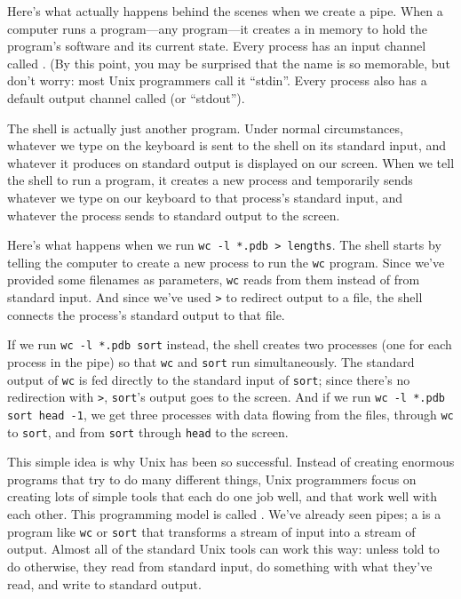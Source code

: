 \documentclass{book}
\begin{document}
Here's what actually happens behind the scenes when we create a pipe.
When a computer runs a program---any program---it creates a
 in memory to hold the program's software
and its current state. Every process has an input channel called
. (By this point, you may be
surprised that the name is so memorable, but don't worry: most Unix
programmers call it ``stdin''. Every process also has a default output
channel called  (or
``stdout'').

The shell is actually just another program. Under normal circumstances,
whatever we type on the keyboard is sent to the shell on its standard
input, and whatever it produces on standard output is displayed on our
screen. When we tell the shell to run a program, it creates a new
process and temporarily sends whatever we type on our keyboard to that
process's standard input, and whatever the process sends to standard
output to the screen.

Here's what happens when we run
\texttt{wc -l *.pdb \textgreater{} lengths}. The shell starts by telling
the computer to create a new process to run the \texttt{wc} program.
Since we've provided some filenames as parameters, \texttt{wc} reads
from them instead of from standard input. And since we've used
\texttt{\textgreater{}} to redirect output to a file, the shell connects
the process's standard output to that file.

If we run \texttt{wc -l *.pdb \textbar{} sort} instead, the shell
creates two processes (one for each process in the pipe) so that
\texttt{wc} and \texttt{sort} run simultaneously. The standard output of
\texttt{wc} is fed directly to the standard input of \texttt{sort};
since there's no redirection with \texttt{\textgreater{}},
\texttt{sort}'s output goes to the screen. And if we run
\texttt{wc -l *.pdb \textbar{} sort \textbar{} head -1}, we get three
processes with data flowing from the files, through \texttt{wc} to
\texttt{sort}, and from \texttt{sort} through \texttt{head} to the
screen.

This simple idea is why Unix has been so successful. Instead of creating
enormous programs that try to do many different things, Unix programmers
focus on creating lots of simple tools that each do one job well, and
that work well with each other. This programming model is called
. We've already seen
pipes; a  is a program like \texttt{wc} or
\texttt{sort} that transforms a stream of input into a stream of output.
Almost all of the standard Unix tools can work this way: unless told to
do otherwise, they read from standard input, do something with what
they've read, and write to standard output.
\end{document}
